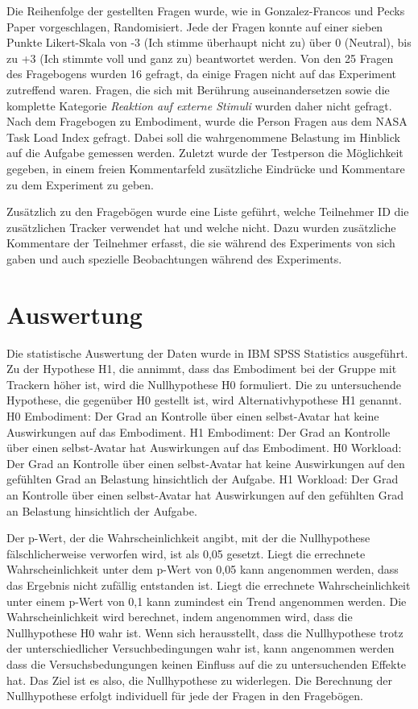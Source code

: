 Die Reihenfolge der gestellten Fragen wurde, wie in Gonzalez-Francos und Pecks Paper vorgeschlagen, Randomisiert. Jede der Fragen konnte auf einer sieben Punkte Likert-Skala von -3 (Ich stimme überhaupt nicht zu) über 0 (Neutral), bis zu +3 (Ich stimmte voll und ganz zu) beantwortet werden.
Von den 25 Fragen des Fragebogens wurden 16 gefragt, da einige Fragen nicht auf das Experiment zutreffend waren. Fragen, die sich mit Berührung auseinandersetzen sowie die komplette Kategorie \textit{Reaktion auf externe Stimuli} wurden daher nicht gefragt.
Nach dem Fragebogen zu Embodiment, wurde die Person Fragen aus dem NASA Task Load Index \cite{HART1988} gefragt. Dabei soll die wahrgenommene Belastung im Hinblick auf die Aufgabe gemessen werden.
Zuletzt wurde der Testperson die Möglichkeit gegeben, in einem freien Kommentarfeld zusätzliche Eindrücke und Kommentare zu dem Experiment zu geben.

Zusätzlich zu den Fragebögen wurde eine Liste geführt, welche Teilnehmer ID die zusätzlichen Tracker verwendet hat und welche nicht. Dazu wurden zusätzliche Kommentare der Teilnehmer erfasst, die sie während des Experiments von sich gaben und auch spezielle Beobachtungen während des Experiments.

\section{Auswertung}
Die statistische Auswertung der Daten wurde in IBM SPSS Statistics ausgeführt. 
Zu der Hypothese H1, die annimmt, dass das Embodiment bei der Gruppe mit Trackern höher ist, wird die Nullhypothese H0 formuliert. Die zu untersuchende Hypothese, die gegenüber H0 gestellt ist, wird Alternativhypothese H1 genannt.
H0 Embodiment: Der Grad an Kontrolle über einen selbst-Avatar hat keine Auswirkungen auf das Embodiment.
H1 Embodiment: Der Grad an Kontrolle über einen selbst-Avatar hat Auswirkungen auf das Embodiment.
H0 Workload: Der Grad an Kontrolle über einen selbst-Avatar hat keine Auswirkungen auf den gefühlten Grad an Belastung hinsichtlich der Aufgabe.
H1 Workload: Der Grad an Kontrolle über einen selbst-Avatar hat Auswirkungen auf den gefühlten Grad an Belastung hinsichtlich der Aufgabe.

Der p-Wert, der die Wahrscheinlichkeit angibt, mit der die Nullhypothese fälschlicherweise verworfen wird, ist als 0,05 gesetzt.
Liegt die errechnete Wahrscheinlichkeit unter dem p-Wert von 0,05 kann angenommen werden, dass das Ergebnis nicht zufällig entstanden ist. Liegt die errechnete Wahrscheinlichkeit unter einem p-Wert von 0,1 kann zumindest ein Trend angenommen werden.
Die Wahrscheinlichkeit wird berechnet, indem angenommen wird, dass die Nullhypothese H0 wahr ist. Wenn sich herausstellt, dass die Nullhypothese trotz der unterschiedlicher Versuchbedingungen wahr ist, kann angenommen werden dass die Versuchsbedungungen keinen Einfluss auf die zu untersuchenden Effekte hat. Das Ziel ist es also, die Nullhypothese zu widerlegen.
Die Berechnung der Nullhypothese erfolgt individuell für jede der Fragen in den Fragebögen.

